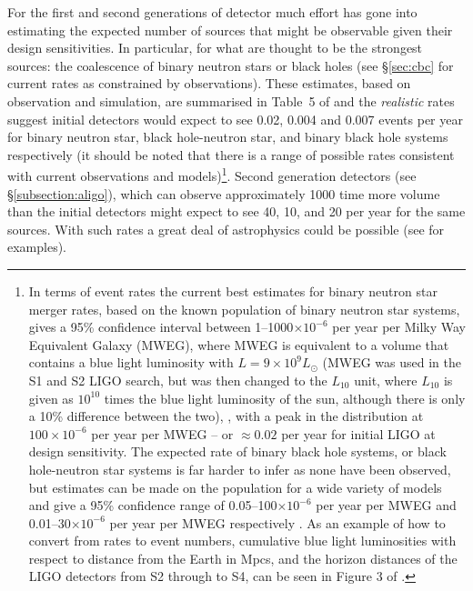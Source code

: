 \documentclass{article}
\begin{document}
For the first and second generations of detector much effort has gone into 
estimating the expected number of sources that might be observable given their
design sensitivities. In particular, for what are thought to be the strongest
sources: the coalescence of binary neutron stars or black holes (see
\S\ref{sec:cbc} for current rates as constrained by observations). These 
estimates, based on observation and simulation, are summarised in Table~5 of
\cite{Abadie:2010e} and the {\it realistic} rates suggest initial detectors
would expect to see 0.02, 0.004 and 0.007 events per year for binary neutron
star, black hole-neutron star, and binary black hole systems respectively (it
should be noted that there is a range of possible rates consistent with current
observations and models)\footnote{In terms of event rates the current best
estimates for binary neutron star merger rates, based on the known population of
binary neutron star systems, gives a 95\% confidence interval between
1--1000$\times10^{-6}$ per year per Milky Way Equivalent Galaxy (MWEG), where
MWEG is equivalent to a volume that contains a blue light luminosity with $L =
9\times10^9L_{\odot}$ (MWEG was used in the S1 and S2 LIGO search, but was then
changed to the $L_{10}$ unit, where $L_{10}$ is given as $10^{10}$ times the
blue light luminosity of the sun, although there is only a 10\% difference
between the two), \cite{Abadie:2010e, Kalogera:2004a, Kalogera:2004b}, with a
peak in the distribution at $100\times10^{-6}$ per year per MWEG -- or $\approx
0.02$ per year for initial LIGO at design sensitivity. The expected rate of
binary black hole systems, or black hole-neutron star systems is far harder to
infer as none have been observed, but estimates can be made on the population
for a wide variety of models and give a 95\% confidence range of
0.05--100$\times10^{-6}$ per year per MWEG and 0.01--30$\times10^{-6}$ per year
per MWEG respectively \cite{Abadie:2010e, OShaughnessy:2005, OShaughnessy:2008,
Abbott:2008a}. As an example of how to convert from rates to event numbers,
cumulative blue light luminosities with respect to distance from the Earth in
Mpcs, and the horizon distances of the LIGO detectors from S2 through to S4, can
be seen in Figure 3 of \cite{Abbott:2008a}.}. Second generation detectors (see
\S\ref{subsection:aligo}), which can observe approximately 1000 time more volume
than the initial detectors might expect to see 40, 10, and 20 per year for the
same sources. With such rates a great deal of astrophysics could be possible
(see \cite{Sathyaprakash:2009} for examples).
\end{document}
